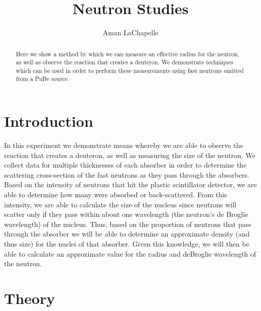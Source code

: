 \documentclass{article}
\title{Neutron Studies}
\author{Aman LaChapelle}
\begin{document}
\raggedright
\maketitle

\begin{abstract}
  Here we show a method by which we can measure an effective radius for the neutron, as well as observe the reaction that creates a deuteron.  We demonstrate techniques which can be used in order to perform these measurements using fast neutrons emitted from a PuBe source.
\end{abstract}

\tableofcontents
\newpage

\section{Introduction}
  In this experiment we demonstrate means whereby we are able to observe the reaction that creates a deuteron, as well as measuring the size of the neutron.  We collect data for multiple thicknesses of each absorber in order to determine the scattering cross-section of the fast neutrons as they pass through the absorbers.  Based on the intensity of neutrons that hit the plastic scintillator detector, we are able to determine how many were absorbed or back-scattered.  From this intensity, we are able to calculate the size of the nucleus since neutrons will scatter only if they pass within about one wavelength (the neutron's de Broglie wavelength) of the nucleus.  Thus, based on the proportion of neutrons that pass through the absorber we will be able to determine an approximate density (and thus size) for the nuclei of that absorber.  Given this knowledge, we will then be able to calculate an approximate value for the radius and deBroglie wavelength of the neutron.

\section{Theory}
\end{document}
